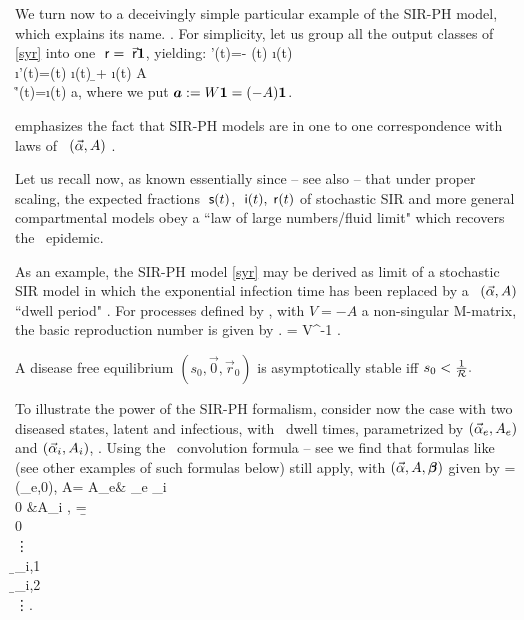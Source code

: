 \EEN
\eeD

We turn now to a   deceivingly simple particular example  of the SIR-PH model, which explains its name.
 . For simplicity, let us group  all the output classes of \eqref{syr} into one $\; \mathsf r=\; \vec {\mathsf r}  {\mbox{\boldmath$1$}}$,  yielding:
  \bc \s'(t)=- \s(t) \vec \i(t) \bff \b\\
\vec \i'(t)=\s(t) \vec \i(t) \bff \b \va + \vec \i(t) A\\ \r'(t)=\vec \i(t) \bff a,\ec \ee
where we put ${\mbox{\boldmath$a$}}:=W {\mbox{\boldmath$1$}}=(-A) {\mbox{\boldmath$1$}}$.

 emphasizes the fact that SIR-PH models are in one to one correspondence with laws of \PH\ $(\vec \alpha, A)$ \cite[(21)]{Riano}.

Let us recall now, as known essentially since \cite{Kurtz} -- see also \cite[Thm. 2.2.7]{Britton}--
that under proper scaling, the  expected {fractions} $\;\mathsf s(t)$, $\;\mathsf i(t), \; \mathsf r(t)$  of stochastic SIR and more general { compartmental models} obey  a ``law of large numbers/fluid limit"  which recovers the \det\ epidemic.

As an example, the SIR-PH model \eqref{syr}
 may be derived as limit  of a stochastic SIR model in which the exponential infection time  has been replaced by
 a \PH\ $(\vec \alpha, A)$ ``dwell period" \cite{Hurtado}.
\eeR
 \beP {}
For processes defined by , with $V=-A$ a non-singular M-matrix,
the basic reproduction number is given by \cite[Thm. 2.1]{Arino}.
 \mR=   \va  \;  V^{-1} \bb.\ee

A disease free equilibrium $(s_0,\vec 0, \vec r_0)$ is asymptotically stable iff $s_0 < \frac 1{\mathcal R}.$


\eeP





To illustrate the power of the SIR-PH formalism, consider now the  case with two diseased states,   latent and  infectious,     with \PH\ dwell times, parametrized by $(\vec \alpha_e,A_e)$ and $(\vec \alpha_i,A_i)$, \resp.
Using the \wk\ convolution formula -- see \fe \cite[Thm. 3.1.26]{bladt2017matrix} we find
that  formulas like  (see other examples of such formulas below) still apply, with   $(\vec \alpha, A, {\mbox{\boldmath$\beta$}})$
given by
  \va=(\va_e,0), A= \bep A_e& \ba_e \va_i \\ 0 &A_i \eep,
 \bff \b=\\0\\ \vdots\\ \b_{i,1}\\ \b_{i,2} \\ \vdots\eep. %
\ee

